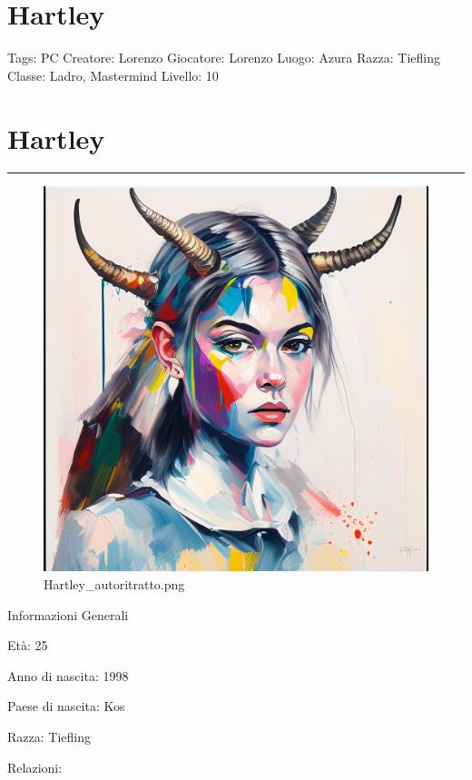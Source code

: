 \section{Hartley}\label{hartley}

Tags: PC Creatore: Lorenzo Giocatore: Lorenzo Luogo: Azura Razza:
Tiefling Classe: Ladro, Mastermind Livello: 10

\section{Hartley}\label{hartley-1}

\begin{center}\rule{0.5\linewidth}{0.5pt}\end{center}

\begin{figure}
\centering
\includegraphics{Hartley_autoritratto.png}
\caption{Hartley\_autoritratto.png}
\end{figure}

Informazioni Generali

Età: 25

Anno di nascita: 1998

Paese di nascita: Kos

Razza: Tiefling

Relazioni:

